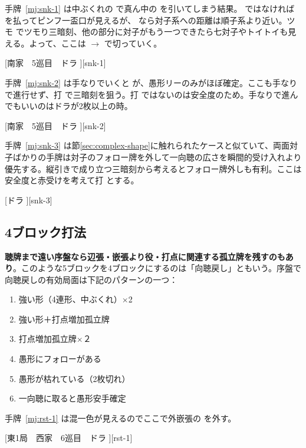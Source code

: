 \documentclass[../nankiru_main.tex]{subfiles}
\begin{document}
手牌~\ref{mj:snk-1} は中ぶくれの  で真ん中の  を引いてしまう結果。 ではなければ  を払ってピンフ一盃口が見えるが、 なら対子系への距離は順子系より近い。ツモ  でツモり三暗刻、他の部分に対子がもう一つできたら七対子やトイトイも見える。よって、ここは  $\to$  で切っていく\citep[][p.~73]{zero-teyaku}。

[南家　5巡目　ドラ ][snk-1]

手牌~\ref{mj:snk-2} は手なりでいくと  が、愚形リーのみがほぼ確定。ここも手なりで進行せず、打  で三暗刻を狙う。打  ではないのは安全度のため。手なりで進んでもいいのはドラが2枚以上の時\citep[][p.~74]{zero-teyaku}。

[南家　5巡目　ドラ ][snk-2]

手牌~\ref{mj:snk-3} は節\ref{sec:complex-shape}に触れられたケースと似ていて、両面対子ばかりの手牌は対子のフォロー牌を外して一向聴の広さを瞬間的受け入れより優先する。縦引きで成り立つ三暗刻から考えるとフォロー牌外しも有利。ここは安全度と赤受けを考えて打  とする\citep[][p.~74]{zero-teyaku}。

[ドラ ][snk-3]


\subsection{4ブロック打法}

\textbf{聴牌まで遠い序盤なら辺張・嵌張より役・打点に関連する孤立牌を残すのもあり}\citep[][pp.~158--159]{suphx}。このような5ブロックを4ブロックにするのは「向聴戻し」ともいう。序盤で向聴戻しの有効局面は下記のパターンの一つ\citep{gendai-shantenback}：

\begin{enumerate}
\item 強い形（4連形、中ぶくれ）$\times$2
\item 強い形＋打点増加孤立牌
\item 打点増加孤立牌$\times$２
\item 愚形にフォローがある
\item 愚形が枯れている（2枚切れ）
\item 一向聴に取ると愚形安手確定
\end{enumerate}

手牌~\ref{mj:rst-1} は混一色が見えるのでここで外嵌張の  を外す。

[東1局　西家　6巡目　ドラ ][rst-1]
\end{document}
